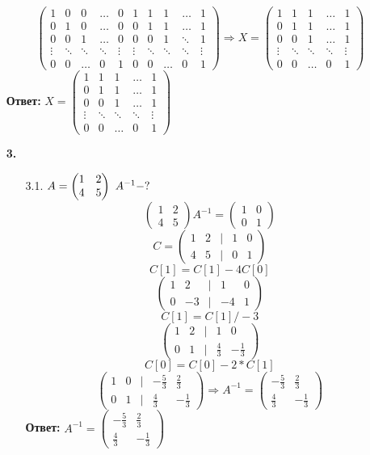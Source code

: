 \documentclass[a4paper]{article}
\newcommand{\mat}[1]{\begin{pmatrix} #1 \end{pmatrix}}
\renewcommand{\f}[2]{\frac{#1}{#2}}
\newcommand{\ts}{\text{\space}}
\renewcommand{\r}{\Rightarrow}
\begin{document}
\begin{enumerate}
    $$\mat{
    1 & 0 & 0 & \ldots & 0  & 1 & 1 & 1 & \ldots & 1\\
    0 & 1 & 0 & \ldots & 0  & 0 & 1 & 1 & \ldots & 1\\
    0 & 0 & 1 & \ldots & 0  & 0 & 0 & 1 & \ddots & 1\\
    \vdots & \ddots & \ddots & \ddots & \vdots  & \vdots & \ddots & \ddots & \ddots & \vdots\\
    0 & 0 & \ldots & 0 & 1 & 0 & 0 & \ldots & 0 & 1 } \r X=\mat{
    1 & 1 & 1 & \ldots & 1 \\
    0 & 1 & 1 & \ldots & 1 \\
    0 & 0 & 1 & \ldots & 1 \\
    \vdots & \ddots & \ddots & \ddots & \vdots \\
    0 & 0 & \ldots & 0 & 1}$$
    \textbf{Ответ: } $X=\mat{
        1 & 1 & 1 & \ldots & 1 \\
        0 & 1 & 1 & \ldots & 1 \\
        0 & 0 & 1 & \ldots & 1 \\
        \vdots & \ddots & \ddots & \ddots & \vdots \\
        0 & 0 & \ldots & 0 & 1}$
    \item[\textbf{3.}]
    \begin{enumerate}
        \item[3.1.]
        $A = \mat{1 & 2 \\ 4 & 5} \ts A^{-1} - ?$\\
        $$\mat{1 & 2 \\ 4 & 5}A^{-1} = \mat{1 & 0\\ 0 & 1}$$
        $$C = \mat{1 & 2 & | & 1 & 0\\ 4 & 5 & | & 0 & 1}$$
        $$C[1] = C[1]-4C[0]$$
        $$\mat{1 & 2 & | & 1 & 0\\ 0 & -3 & | & -4 & 1}$$
        $$C[1] = C[1]/-3$$
        $$\mat{1 & 2 & | & 1 & 0 \\ 0 & 1 & | & \f{4}{3} & -\f{1}{3}}$$
        $$C[0] = C[0]-2*C[1]$$
        $$\mat{1 & 0 & | & -\f{5}{3} & \f{2}{3} \\ 0 & 1 & | & \f{4}{3} & -\f{1}{3}}\r A^{-1} = \mat{-\f{5}{3} & \f{2}{3} \\ \f{4}{3} & -\f{1}{3}}$$
        \textbf{Ответ: } $A^{-1} = \mat{-\f{5}{3} & \f{2}{3} \\ \f{4}{3} & -\f{1}{3}}$


\end{enumerate}
\end{enumerate}
\end{document}
